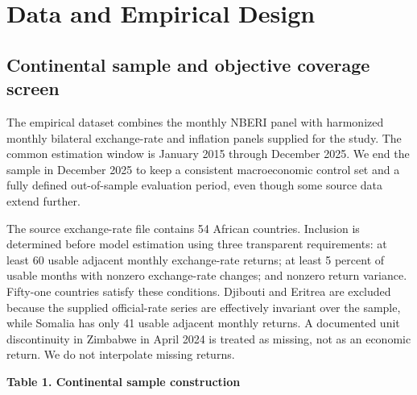 \documentclass[11pt]{article}
\begin{document}
\section{Data and Empirical Design}\label{data-and-empirical-design}

\subsection{Continental sample and objective coverage
screen}\label{continental-sample-and-objective-coverage-screen}

The empirical dataset combines the monthly NBERI panel with harmonized
monthly bilateral exchange-rate and inflation panels supplied for the
study. The common estimation window is January 2015 through December
2025. We end the sample in December 2025 to keep a consistent
macroeconomic control set and a fully defined out-of-sample evaluation
period, even though some source data extend further.

The source exchange-rate file contains 54 African countries. Inclusion
is determined before model estimation using three transparent
requirements: at least 60 usable adjacent monthly exchange-rate returns;
at least 5 percent of usable months with nonzero exchange-rate changes;
and nonzero return variance. Fifty-one countries satisfy these
conditions. Djibouti and Eritrea are excluded because the supplied
official-rate series are effectively invariant over the sample, while
Somalia has only 41 usable adjacent monthly returns. A documented unit
discontinuity in Zimbabwe in April 2024 is treated as missing, not as
an economic return. We do not interpolate missing returns.

\textbf{Table 1. Continental sample construction}
\end{document}
